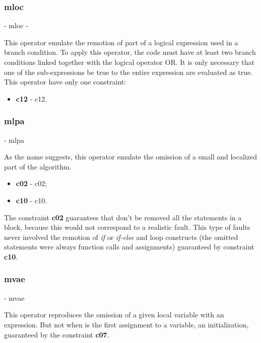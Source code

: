 	\subsubsection{\textbf{\acs{mloc}}} - \Acl{mloc} - 
	\hypertarget{mloc}{}

	This operator emulate the remotion of part of a logical expression used in a branch condition. To apply this operator, the code must have at least two branch conditions linked together with the logical operator OR. It is only necessary that one of the sub-expressions be true to the entire expression are evaluated as true. This operator have only one constraint:

	\begin{itemize}
		\item \textbf{\acs{c12}} - \Acl{c12}.
	\end{itemize}

	\subsubsection{\textbf{\acs{mlpa}}} - \Acl{mlpa}
	\hypertarget{mlpa}{}

	As the name suggests, this operator emulate the omission of a small and localized part of the algorithm.

	\begin{itemize}
		\item \textbf{\acs{c02}} - \Acl{c02};
		\item \textbf{\acs{c10}} - \Acl{c10}.
	\end{itemize}

	The constraint \textbf{\ac{c02}} guarantees that don't be removed all the statements in a block, because this would not correspond to a realistic fault. This type of faults never involved the remotion of \textit{if} or \textit{if-else} and loop constructs (the omitted statements were always function calls and assignments) guaranteed by constraint \textbf{\ac{c10}}.

	\subsubsection{\textbf{\acs{mvae}}} - \Acl{mvae}
	\hypertarget{mvae}{}

	This operator reproduces the omission of a given local variable with an expression. But not when is the first assignment to a variable, an initialization, guaranteed by the constraint \textbf{\acs{c07}}.

